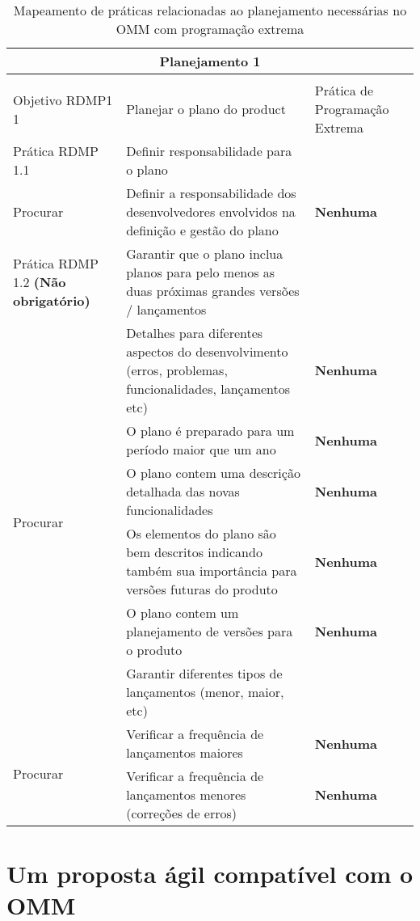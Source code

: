 \begin{longtable}{|p{2cm}|p{7cm}|p{7cm}|}
  \caption{Mapeamento de práticas relacionadas ao planejamento
    necessárias no OMM com programação extrema} \\
  \multicolumn{3}{|c|}{\cellcolor[gray]{0.6} Planejamento 1}\\
  \endhead
  & & \\
  \hline \cellcolor[gray]{0.6} Objetivo RDMP1 1 & \cellcolor[gray]{0.6}
  Planejar o plano do product &
  Prática de Programação Extrema \\
  \hline \cellcolor[gray]{0.9} Prática RDMP 1.1 & \cellcolor[gray]{0.9}
  Definir responsabilidade para o plano &
  \\
  \hline \multirow{1}{*}{Procurar} & Definir a responsabilidade dos
  desenvolvedores envolvidos na definição e gestão do plano  &\textbf{Nenhuma} \\
  \hline \cellcolor[gray]{0.9} Prática RDMP 1.2 \textbf{(Não
    obrigatório)} & \cellcolor[gray]{0.9} Garantir que o plano inclua
  planos para pelo menos as duas próximas grandes versões / lançamentos & \\
  \hline \multirow{6}{*}{Procurar} & Detalhes para diferentes aspectos
  do desenvolvimento (erros, problemas, funcionalidades, lançamentos
  etc) &\textbf{Nenhuma} \\
  \cline{2-3} & O plano é preparado para um período maior que um ano &\textbf{Nenhuma} \\
  \cline{2-3} & O plano contem uma descrição detalhada das novas
  funcionalidades  &\textbf{Nenhuma} \\
  \cline{2-3} & Os elementos do plano são bem descritos indicando
  também sua importância para versões futuras do produto
  &\textbf{Nenhuma} \\
  \cline{2-3} & O plano contem um planejamento de versões para o
  produto &\textbf{Nenhuma} \\
  \hline \cellcolor[gray]{0.9} Prática RDMP1 1.3 & \cellcolor[gray]{0.9}
  Garantir diferentes tipos de lançamentos (menor, maior, etc) & \\
  \hline \multirow{2}{*}{Procurar} & Verificar a frequência de
  lançamentos maiores &\textbf{Nenhuma} \\
  \cline{2-3} & Verificar a frequência de lançamentos menores (correções
  de erros)  &\textbf{Nenhuma} \\
  \hline
\end{longtable}

\section{Um proposta ágil compatível com o OMM}
\label{sec:openagile-em-omm}

